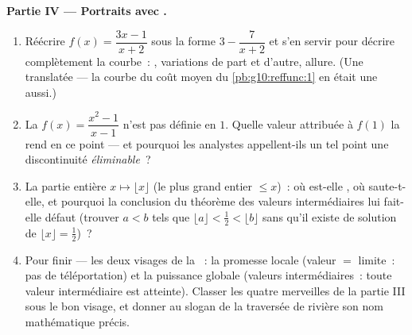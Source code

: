 \begin{problem}
\medskip
\noindent\textbf{Partie IV --- Portraits avec .}
\begin{enumerate}[resume]
  \item Réécrire $f(x) = \dfrac{3x - 1}{x + 2}$ sous la forme
        $3 - \dfrac{7}{x + 2}$ et s'en servir pour décrire
        complètement la courbe~: , variations de part et
        d'autre, allure. (Une  translatée --- la courbe du
        coût moyen du \cref{pb:g10:reffunc:1} en était une aussi.)
  \item La  $f(x) = \dfrac{x^2 - 1}{x - 1}$ n'est pas
        définie en $1$. Quelle valeur attribuée à $f(1)$ la rend
         en ce point --- et pourquoi les analystes
        appellent-ils un tel point une discontinuité
        \emph{éliminable}~?
  \item La  partie entière $x \mapsto \lfloor x \rfloor$
        (le plus grand entier $\leq x$)~: où est-elle , où
        saute-t-elle, et pourquoi la conclusion du théorème des
        valeurs intermédiaires lui fait-elle défaut (trouver
        $a < b$ tels que
        $\lfloor a \rfloor < \frac12 < \lfloor b \rfloor$ sans
        qu'il existe de solution de
        $\lfloor x \rfloor = \frac12$)~?
  \item Pour finir --- les deux visages de la ~: la
        promesse locale (valeur $=$ limite~: pas de téléportation)
        et la puissance globale (valeurs intermédiaires~: toute
        valeur intermédiaire est atteinte). Classer les quatre
        merveilles de la partie III sous le bon visage, et donner au
        slogan de la traversée de rivière son nom mathématique
        précis.
\end{enumerate}
\end{problem}
